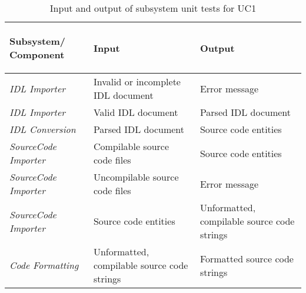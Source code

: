 \renewcommand{\arraystretch}{1.5}
\begin{table*}[ht]
	\begin{center}
		\begin{tabular}{|>{\raggedright\arraybackslash}m{4cm}|>{\raggedright\arraybackslash}m{5cm}|>{\raggedright\arraybackslash}m{5cm}|}
			\hline
			\begin{center}
				\textbf{Subsystem/ Component}
			\end{center} &  \begin{center}
			\textbf{Input} 
		\end{center}&  \begin{center}
		\textbf{Output}
	\end{center} \\ \hline
			\textit{IDL Importer} & Invalid or incomplete IDL document & Error message \\ \hline
			\textit{IDL Importer} & Valid IDL document & Parsed IDL document \\ \hline
			\textit{IDL Conversion} & Parsed IDL document & Source code entities \\ \hline
			\textit{SourceCode Importer} & Compilable source code  files & Source code entities \\ \hline
			\textit{SourceCode Importer} & Uncompilable source code files & Error message \\ \hline
			\textit{SourceCode Importer} & Source code entities & Unformatted, compilable source code strings  \\ \hline
			\textit{Code Formatting} & Unformatted, compilable source code strings & Formatted source code strings  \\ \hline
		\end{tabular}
		\caption{Input and output of subsystem unit tests for UC1}\label{tbl:UnitTestsUC1}
	\end{center}
\end{table*}

